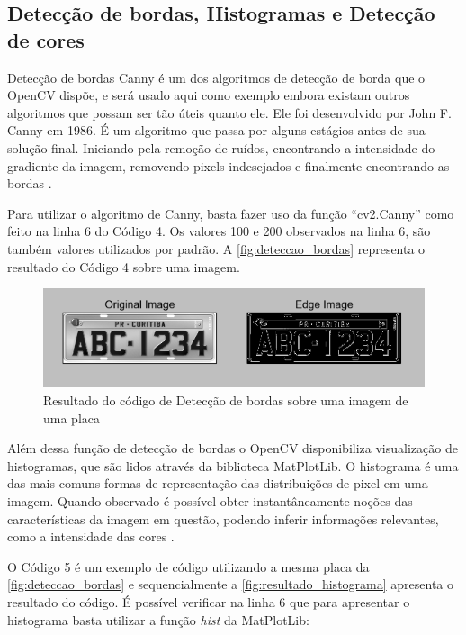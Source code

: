 \subsection{Detecção de bordas, Histogramas e Detecção de cores}

Detecção de bordas Canny é um dos algoritmos de detecção de borda que o OpenCV dispõe, e será usado aqui como exemplo embora existam outros algoritmos que possam ser tão úteis quanto ele. Ele foi desenvolvido por John F. Canny em 1986. É um algoritmo que passa por alguns estágios antes de sua solução final. Iniciando pela remoção de ruídos, encontrando a intensidade do gradiente da imagem, removendo pixels indesejados e finalmente encontrando as bordas \cite{opencv}. 

Para utilizar o algoritmo de Canny, basta fazer uso da função ``cv2.Canny'' como feito na linha 6 do Código 4. Os valores 100 e 200 observados na linha 6, são também valores utilizados por padrão. A \autoref{fig:deteccao_bordas} representa o resultado do Código 4 sobre uma imagem.



\begin{figure}[htbp]
\caption{\label{fig:deteccao_bordas}Resultado do código de Detecção de bordas sobre uma imagem de uma placa}
\begin{center}
\includegraphics[width=.9\textwidth]{figuras/f4c3.png}
\end{center}
\end{figure} 

Além dessa função de detecção de bordas o OpenCV disponibiliza visualização de histogramas, que são lidos através da biblioteca MatPlotLib. O histograma é uma das mais comuns formas de representação das distribuições de pixel em uma imagem. Quando observado é possível obter instantâneamente noções das características da imagem em questão, podendo inferir informações relevantes, como a intensidade das cores \cite{neta2008limiarizaccao}.

O Código 5 é um exemplo de código utilizando a mesma placa da \autoref{fig:deteccao_bordas} e sequencialmente a \autoref{fig:resultado_histograma} apresenta o resultado do código. É possível verificar na linha 6 que para apresentar o histograma basta utilizar a função \textit{hist} da MatPlotLib:


